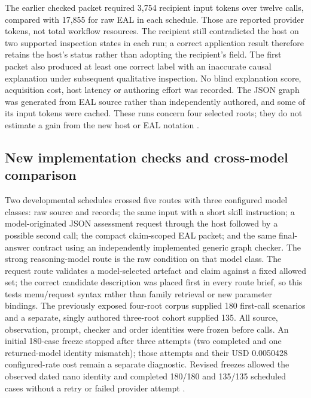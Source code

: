 \documentclass[preprint,12pt]{elsarticle}
\begin{document}
The earlier checked packet required 3,754 recipient input tokens over twelve calls, compared with 17,855 for raw EAL in each schedule. Those are reported provider tokens, not total workflow resources. The recipient still contradicted the host on two supported inspection states in each run; a correct application result therefore retains the host's status rather than adopting the recipient's field. The first packet also produced at least one correct label with an inaccurate causal explanation under subsequent qualitative inspection. No blind explanation score, acquisition cost, host latency or authoring effort was recorded. The JSON graph was generated from EAL source rather than independently authored, and some of its input tokens were cached. These runs concern four selected roots; they do not estimate a gain from the new host or EAL notation \citep{earlArtifactPilot,earlArtifactReplication}.

\subsection{New implementation checks and cross-model comparison}
Two developmental schedules crossed five routes with three configured model classes: raw source and records; the same input with a short skill instruction; a model-originated JSON assessment request through the host followed by a possible second call; the compact claim-scoped EAL packet; and the same final-answer contract using an independently implemented generic graph checker. The strong reasoning-model route is the raw condition on that model class. The request route validates a model-selected artefact and claim against a fixed allowed set; the correct candidate description was placed first in every route brief, so this tests menu/request syntax rather than family retrieval or new parameter bindings. The previously exposed four-root corpus supplied 180 first-call scenarios and a separate, singly authored three-root cohort supplied 135. All source, observation, prompt, checker and order identities were frozen before calls. An initial 180-case freeze stopped after three attempts (two completed and one returned-model identity mismatch); those attempts and their USD 0.0050428 configured-rate cost remain a separate diagnostic. Revised freezes allowed the observed dated nano identity and completed 180/180 and 135/135 scheduled cases without a retry or failed provider attempt \citep{earlCampaign,earlCampaignLive}.
\end{document}
